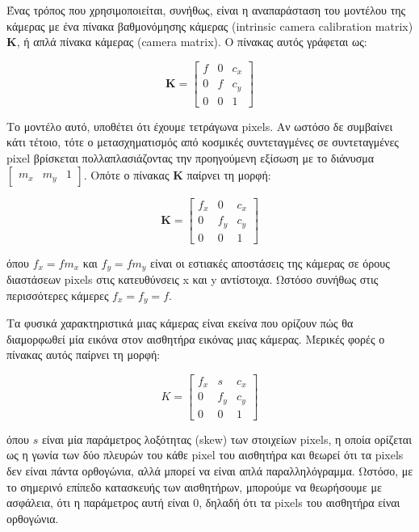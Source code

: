 Ένας τρόπος που χρησιμοποιείται, συνήθως, είναι η αναπαράσταση του μοντέλου της κάμερας με ένα πίνακα βαθμονόμησης κάμερας (intrinsic camera calibration matrix) $\mathbf{K}$, ή απλά πίνακα κάμερας (camera matrix).  Ο πίνακας αυτός γράφεται ως:


\begin{equation}
\mathbf{K}=
\begin{bmatrix}
f & 0 & c_{x}\\
0 & f & c_{y}\\
0 & 0 & 1
\end{bmatrix}
\end{equation}



Το μοντέλο αυτό, υποθέτει ότι έχουμε τετράγωνα pixels. Αν ωστόσο δε συμβαίνει κάτι τέτοιο, τότε ο μετασχηματισμός από κοσμικές συντεταγμένες σε συντεταγμένες pixel βρίσκεται πολλαπλασιάζοντας την προηγούμενη εξίσωση με το διάνυσμα $\begin{bmatrix}m_{x} & m_{y} & 1\end{bmatrix}$. Οπότε ο πίνακας $\mathbf{K}$ παίρνει τη μορφή:

\begin{equation}
\mathbf{K}=
\begin{bmatrix}
f_{x} & 0 & c_{x}\\
0 & f_{y} & c_{y}\\
0 & 0 & 1
\end{bmatrix}
\end{equation}

όπου $f_{x}=fm_{x}$ και $f_{y}=fm_{y}$ είναι οι εστιακές αποστάσεις της κάμερας σε όρους διαστάσεων pixels στις κατευθύνσεις x και y αντίστοιχα. Ωστόσο συνήθως στις περισσότερες κάμερες $f_{x}=f_{y}=f$.



Τα φυσικά χαρακτηριστικά μιας κάμερας είναι εκείνα που ορίζουν πώς θα διαμορφωθεί μία εικόνα στον αισθητήρα εικόνας μιας κάμερας. 
Μερικές φορές ο πίνακας αυτός παίρνει τη μορφή:

\begin{equation}
K=
\begin{bmatrix}
f_{x} & s & c_{x}\\
0 & f_{y} & c_{y}\\
0 & 0 & 1
\end{bmatrix}
\end{equation}

 όπου $s$ είναι μία παράμετρος λοξότητας (skew) των στοιχείων pixels, η οποία ορίζεται ως η γωνία των δύο πλευρών του κάθε pixel του αισθητήρα και θεωρεί ότι τα pixels δεν είναι πάντα ορθογώνια, αλλά μπορεί να είναι απλά παραλληλόγραμμα. Ωστόσο, με το σημερινό επίπεδο κατασκευής των αισθητήρων, μπορούμε να θεωρήσουμε με ασφάλεια, ότι η παράμετρος αυτή είναι 0, δηλαδή ότι τα pixels του αισθητήρα είναι ορθογώνια.


